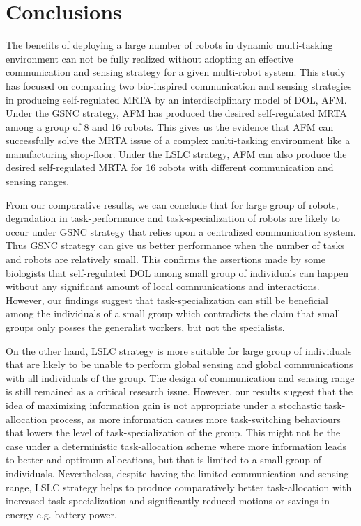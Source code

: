 \chapter{Conclusions}
The benefits of deploying a large number of robots in dynamic multi-tasking environment can not be fully realized without adopting an effective communication and sensing strategy for a given multi-robot system. This study has focused on comparing two bio-inspired  communication and sensing strategies in producing self-regulated MRTA by an interdisciplinary model of DOL, AFM. Under the GSNC strategy, AFM has produced the desired self-regulated MRTA among a group of 8 and 16 robots. This gives us the evidence that AFM can successfully solve the MRTA issue of a complex multi-tasking environment like a manufacturing shop-floor. Under the LSLC strategy, AFM can also produce the desired self-regulated MRTA for 16 robots with different communication and sensing ranges.

From our comparative results, we can conclude that for large group of robots,  degradation in  task-performance and task-specialization of robots are likely to occur  under GSNC strategy that relies upon a centralized communication system. Thus GSNC strategy can give us better performance when the number of tasks and robots are relatively small. This confirms the assertions made by some biologists that self-regulated DOL among small group of individuals can happen without any significant amount of local communications and interactions. However, our findings suggest that task-specialization can still be beneficial among the individuals of a small group which contradicts the claim that small groups only posses the generalist workers, but not the specialists.

On the other hand, LSLC strategy is more suitable for large group of individuals that are likely to be unable to perform global sensing and global communications with all individuals of the group. The design of communication and sensing range is still remained as a critical research issue. However, our results suggest that the idea of maximizing information gain is not appropriate under a stochastic task-allocation process, as more information causes more task-switching behaviours that lowers the level of task-specialization of the group. This might not be the case under a deterministic task-allocation scheme where more information leads to better and optimum allocations, but that is limited to a small group of individuals. Nevertheless, despite having the limited communication and sensing range, LSLC strategy helps to produce comparatively better task-allocation with increased task-specialization and significantly reduced motions or savings in energy e.g. battery power.

